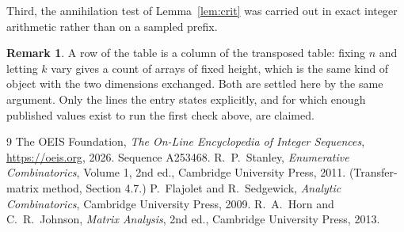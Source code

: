 \documentclass[11pt,a4paper]{article}
\theoremstyle{plain}
\theoremstyle{definition}
\newtheorem{remark}[theorem]{Remark}
\begin{document}
Third, the annihilation test of Lemma~\ref{lem:crit} was carried out in exact integer
arithmetic rather than on a sampled prefix.

\begin{remark}
A row of the table is a column of the transposed table: fixing $n$ and letting $k$ vary gives a
count of arrays of fixed height, which is the same kind of object with the two dimensions
exchanged. Both are settled here by the same argument. Only the lines the entry states
explicitly, and for which enough published values exist to run the first check above, are
claimed.
\end{remark}

\begin{thebibliography}{9}
 The OEIS Foundation, \emph{The On-Line Encyclopedia of Integer
Sequences}, \url{https://oeis.org}, 2026. Sequence A253468.
 R.~P.~Stanley, \emph{Enumerative Combinatorics}, Volume 1, 2nd ed.,
Cambridge University Press, 2011. (Transfer-matrix method, Section 4.7.)
 P.~Flajolet and R.~Sedgewick, \emph{Analytic Combinatorics}, Cambridge
University Press, 2009.
 R.~A.~Horn and C.~R.~Johnson, \emph{Matrix Analysis}, 2nd ed., Cambridge
University Press, 2013.
\end{thebibliography}
\end{document}
